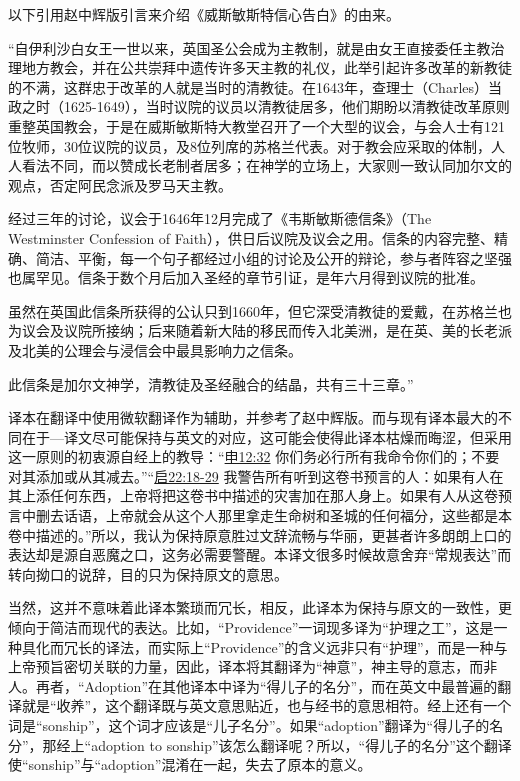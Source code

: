 \documentclass[12pt, a4paper, oneside]{ctexart}
\begin{document}
以下引用赵中辉版引言来介绍《威斯敏斯特信心告白》的由来。

“自伊利沙白女王一世以来，英国圣公会成为主教制，就是由女王直接委任主教治理地方教会，并在公共崇拜中遗传许多天主教的礼仪，此举引起许多改革的新教徒的不满，这群忠于改革的人就是当时的清教徒。在1643年，查理士（Charles）当政之时（1625-1649），当时议院的议员以清教徒居多，他们期盼以清教徒改革原则重整英国教会，于是在威斯敏斯特大教堂召开了一个大型的议会，与会人士有121位牧师，30位议院的议员，及8位列席的苏格兰代表。对于教会应采取的体制，人人看法不同，而以赞成长老制者居多；在神学的立场上，大家则一致认同加尔文的观点，否定阿民念派及罗马天主教。

经过三年的讨论，议会于1646年12月完成了《韦斯敏斯德信条》（The Westminster Confession of Faith），供日后议院及议会之用。信条的内容完整、精确、简洁、平衡，每一个句子都经过小组的讨论及公开的辩论，参与者阵容之坚强也属罕见。信条于数个月后加入圣经的章节引证，是年六月得到议院的批准。

虽然在英国此信条所获得的公认只到1660年，但它深受清教徒的爱戴，在苏格兰也为议会及议院所接纳；后来随着新大陆的移民而传入北美洲，是在英、美的长老派及北美的公理会与浸信会中最具影响力之信条。

此信条是加尔文神学，清教徒及圣经融合的结晶，共有三十三章。”

译本在翻译中使用微软翻译作为辅助，并参考了赵中辉版。而与现有译本最大的不同在于---译文尽可能保持与英文的对应，这可能会使得此译本枯燥而晦涩，但采用这一原则的初衷源自经上的教导：“\href{https://biblehub.com/deuteronomy/12-32.htm}{申12:32} 你们务必行所有我命令你们的；不要对其添加或从其减去。”“\href{https://biblehub.com/revelation/22-18.htm}{启22:18-29} 我警告所有听到这卷书预言的人：如果有人在其上添任何东西，上帝将把这卷书中描述的灾害加在那人身上。如果有人从这卷预言中删去话语，上帝就会从这个人那里拿走生命树和圣城的任何福分，这些都是本卷中描述的。”所以，我认为保持原意胜过文辞流畅与华丽，更甚者许多朗朗上口的表达却是源自恶魔之口，这务必需要警醒。本译文很多时候故意舍弃“常规表达”而转向拗口的说辞，目的只为保持原文的意思。

当然，这并不意味着此译本繁琐而冗长，相反，此译本为保持与原文的一致性，更倾向于简洁而现代的表达。比如，“Providence”一词现多译为“护理之工”，这是一种具化而冗长的译法，而实际上“Providence”的含义远非只有“护理”，而是一种与上帝预旨密切关联的力量，因此，译本将其翻译为“神意”，神主导的意志，而非人。再者，“Adoption”在其他译本中译为“得儿子的名分”，而在英文中最普遍的翻译就是“收养”，这个翻译既与英文意思贴近，也与经书的意思相符。经上还有一个词是“sonship”，这个词才应该是“儿子名分”。如果“adoption”翻译为“得儿子的名分”，那经上“adoption to sonship”该怎么翻译呢？所以，“得儿子的名分”这个翻译使“sonship”与“adoption”混淆在一起，失去了原本的意义。
\end{document}
